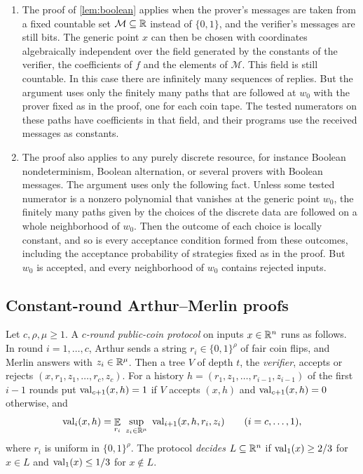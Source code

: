 \begin{remark}\label{rem:discrete}
\begin{enumerate}[label=\textup{(\alph*)}]
\item The proof of \cref{lem:boolean} applies when the prover's messages are taken from a fixed countable set $\mathcal M\subseteq\mathbb{R}$ instead of $\{0,1\}$, and the verifier's messages are still bits.
The generic point $x$ can then be chosen with coordinates algebraically independent over the field generated by the constants of the verifier, the coefficients of $f$ and the elements of $\mathcal M$.
This field is still countable.
In this case there are infinitely many sequences of replies.
But the argument uses only the finitely many paths that are followed at $w_0$ with the prover fixed as in the proof, one for each coin tape.
The tested numerators on these paths have coefficients in that field, and their programs use the received messages as constants.
\item The proof also applies to any purely discrete resource, for instance Boolean nondeterminism, Boolean alternation, or several provers with Boolean messages.
The argument uses only the following fact.
Unless some tested numerator is a nonzero polynomial that vanishes at the generic point $w_0$, the finitely many paths given by the choices of the discrete data are followed on a whole neighborhood of $w_0$.
Then the outcome of each choice is locally constant, and so is every acceptance condition formed from these outcomes, including the acceptance probability of strategies fixed as in the proof.
But $w_0$ is accepted, and every neighborhood of $w_0$ contains rejected inputs.
\end{enumerate}
\end{remark}

\subsection{Constant-round Arthur--Merlin proofs}

\begin{definition}\label{def:am}
Let $c,\rho,\mu\ge1$.
A \emph{$c$-round public-coin protocol} on inputs $x\in\mathbb{R}^n$ runs as follows.
In round $i=1,\dots,c$, Arthur sends a string $r_i\in\{0,1\}^\rho$ of fair coin flips, and Merlin answers with $z_i\in\mathbb{R}^\mu$.
Then a tree $V$ of depth $t$, the \emph{verifier}, accepts or rejects $(x,r_1,z_1,\dots,r_c,z_c)$.
For a history $h=(r_1,z_1,\dots,r_{i-1},z_{i-1})$ of the first $i-1$ rounds put $\operatorname{val}_{c+1}(x,h)=1$ if $V$ accepts $(x,h)$ and $\operatorname{val}_{c+1}(x,h)=0$ otherwise, and
\begin{equation}\label{eq:amval}
\val_i(x,h)=\EE_{r_i}\ \sup_{z_i\in\RR^\mu}\ \val_{i+1}(x,h,r_i,z_i)\qquad(i=c,\dots,1),
\end{equation}
where $r_i$ is uniform in $\{0,1\}^\rho$.
The protocol \emph{decides} $L\subseteq\mathbb{R}^n$ if $\operatorname{val}_1(x)\ge2/3$ for $x\in L$ and $\operatorname{val}_1(x)\le1/3$ for $x\notin L$.
\end{definition}

